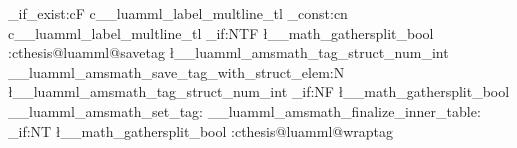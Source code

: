 \ExplSyntaxOn
  {
      {
        \tl_if_exist:cF { c__luamml_label_multline_tl }
          { \tl_const:cn { c__luamml_label_multline_tl } { } }
          {
            \bool_if:NTF \l__math_gathersplit_bool
              { \use:c{thesis@luamml@savetag} \l__luamml_amsmath_tag_struct_num_int }
              { \__luamml_amsmath_save_tag_with_struct_elem:N \l__luamml_amsmath_tag_struct_num_int }
          }
          { \bool_if:NF \l__math_gathersplit_bool { \__luamml_amsmath_set_tag: } }
          {
            \__luamml_amsmath_finalize_inner_table:
            \bool_if:NT \l__math_gathersplit_bool { \use:c{thesis@luamml@wraptag} }
          }
      }
  }

